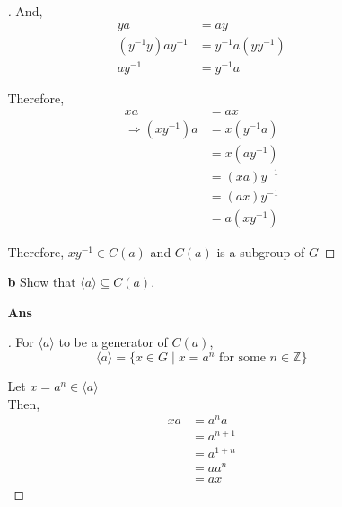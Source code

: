 \documentclass[paper=usletter, fontsize=12pt]{article}
\begin{document}
\begin{itemize}
\begin{itemize}
\begin{enumerate}
\begin{proof}[\unskip\nopunct]
                    And,
                    \begin{align*}
                        ya & = ay \\
                        (y^{-1}y)ay^{-1} & = y^{-1}a(yy^{-1}) \\
                        ay^{-1} & = y^{-1}a
                    \end{align*}

                    Therefore,
                    \begin{align*}
                        xa & = ax \\
                        \Rightarrow (xy^{-1})a & = x(y^{-1}a) \\
                        & = x(ay^{-1}) \\
                        & = (xa)y^{-1} \\
                        & = (ax)y^{-1} \\
                        & = a(xy^{-1})
                    \end{align*}

                    Therefore, $xy^{-1} \in C(a)$ and $C(a)$ is a subgroup of
                    $G$ \qedhere

                \end{proof}
                \vspace{0.2in}

                \item[\textbf{b}] Show that $\langle a \rangle \subseteq C(a)$.
                \item[\textbf{Ans}]
                \begin{proof}[\unskip\nopunct]
                    For $\langle a \rangle$ to be a generator of $C(a)$,\\
                    \begin{equation*}
                        \langle a \rangle = \{x \in G \mid x = a^n \text{ for some } n \in \mathbb{Z}\}
                    \end{equation*}

                    Let $x = a^n \in \langle a \rangle$\\
                    Then,
                    \begin{align*}
                        xa & = a^na \\
                        & = a^{n+1} \\
                        & = a^{1+n} \\
                        & = aa^n \\
                        & = ax
                    \end{align*}


\end{proof}
\end{enumerate}
\end{itemize}
\end{itemize}
\end{document}
